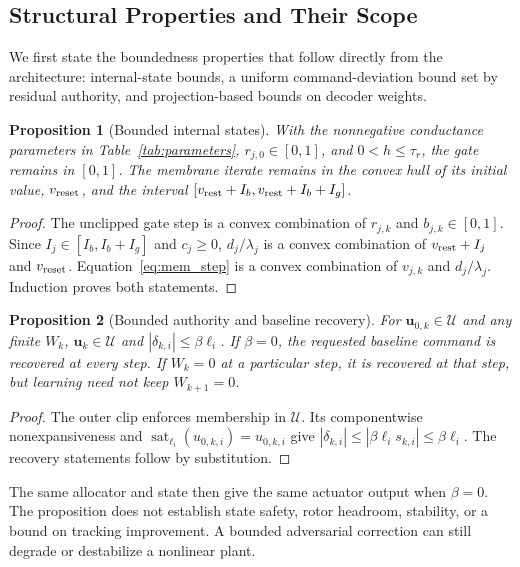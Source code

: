 \documentclass[letterpaper, 10 pt, conference]{ieeeconf}
\newcommand{\sat}{\operatorname{sat}}
\newtheorem{proposition}{Proposition}
\begin{document}
\subsection{Structural Properties and Their Scope}
We first state the boundedness properties that follow directly from the architecture: internal-state bounds, a uniform command-deviation bound set by residual authority, and projection-based bounds on decoder weights.
\begin{proposition}[Bounded internal states]
With the nonnegative conductance parameters in Table~\ref{tab:parameters},
$r_{j,0}\in[0,1]$, and $0<h\le\tau_r$, the gate remains in $[0,1]$.
The membrane iterate remains in the convex hull of its initial value,
$v_{\rm reset}$, and the interval
$[v_{\rm rest}+I_b,v_{\rm rest}+I_b+I_g]$.
\end{proposition}
\begin{proof}
The unclipped gate step is a convex combination of $r_{j,k}$ and
$b_{j,k}\in[0,1]$. Since $I_j\in[I_b,I_b+I_g]$ and $c_j\ge0$,
$d_j/\lambda_j$ is a convex combination of $v_{\rm rest}+I_j$ and
$v_{\rm reset}$. Equation~\eqref{eq:mem_step} is a convex combination of
$v_{j,k}$ and $d_j/\lambda_j$. Induction proves both statements.
\end{proof}

\begin{proposition}[Bounded authority and baseline recovery]
\label{prop:authority}
For $\bm u_{0,k}\in\mathcal U$ and any finite $W_k$,
$\bm u_k\in\mathcal U$ and $|\delta_{k,i}|\le\beta\ell_i$.
If $\beta=0$, the requested baseline command is recovered at every step.
If $W_k=0$ at a particular step, it is recovered at that step, but learning
need not keep $W_{k+1}=0$.
\end{proposition}
\begin{proof}
The outer clip enforces membership in $\mathcal U$. Its componentwise
nonexpansiveness and $\sat_{\ell_i}(u_{0,k,i})=u_{0,k,i}$ give
$|\delta_{k,i}|\le|\beta\ell_i s_{k,i}|\le\beta\ell_i$.
The recovery statements follow by substitution.
\end{proof}
The same allocator and state then give the same actuator output when
$\beta=0$. The proposition does not establish state safety, rotor
headroom, stability, or a bound on tracking improvement. A bounded
adversarial correction can still degrade or destabilize a nonlinear plant.
\end{document}
